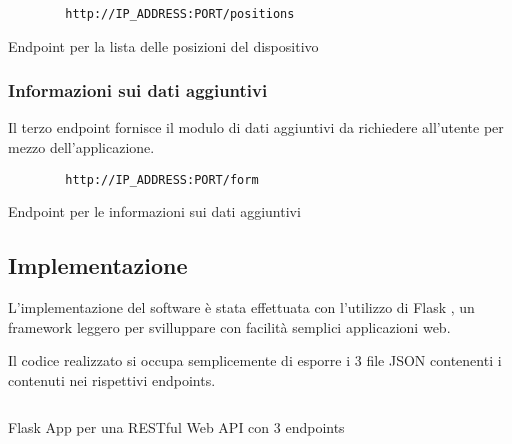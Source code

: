 \begin{listing}[H] 
    \begin{verbatim}
        http://IP_ADDRESS:PORT/positions
    \end{verbatim}
    \caption{Endpoint per la lista delle posizioni del dispositivo}
\end{listing}

\subsubsection{Informazioni sui dati aggiuntivi}
Il terzo endpoint fornisce il modulo di dati aggiuntivi da richiedere all'utente per mezzo dell'applicazione.

\begin{listing}[H] 
    \begin{verbatim}
        http://IP_ADDRESS:PORT/form
    \end{verbatim}
    \caption{Endpoint per le informazioni sui dati aggiuntivi}
\end{listing}

\subsection{Implementazione}
L'implementazione del software è stata effettuata con l'utilizzo di Flask \cite{flask}, un framework leggero 
per svilluppare con facilità semplici applicazioni web.

Il codice realizzato si occupa semplicemente di esporre i 3 file JSON contenenti i contenuti nei rispettivi endpoints.

\begin{listing}[H] 
    \inputminted[frame=single,framesep=10pt]{python}{snippets/server/api/flask.py}
    \caption{Flask App per una RESTful Web API con 3 endpoints}
\end{listing}

